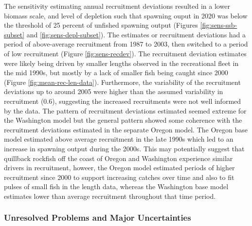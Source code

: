 \documentclass[11pt,
  english,
  a4paper,
]{article}
\begin{document}
\leavevmode\tagmcend\tagstructend\par


The sensitivity estimating annual recruitment deviations resulted in a lower biomass scale, and level of depletion such that spawning ouput in 2020 was below the threshold of 25 percent of unfished spawning output (Figures \ref{fig:sens-ssb-subset} and \ref{fig:sens-depl-subset}). The estimates or recruitment deviations had a period of above-average recruitment from 1987 to 2003, then switched to a period of low recruitment (Figure \ref{fig:sens-recdev}). The recruitment deviation estimates were likely being driven by smaller lengths observed in the recreational fleet in the mid 1990s, but mostly by a lack of smaller fish being caught since 2000 (Figure \ref{fig:mean-rec-len-data}). Furthermore, the variability of the recruitment deviations up to around 2005 were higher than the assumed variability in recruitment (0.6), suggesting the increased recruitments were not well informed by the data. The pattern of recruitment deviations estimated seemed extreme for the Washington model but the general pattern showed some coherence with the recruitment deviations estimated in the separate Oregon model. The Oregon base model estimated above average recruitment in the late 1990s which led to an increase in spawning output during the 2000s. This may potentially suggest that quillback rockfish off the coast of Oregon and Washington experience similar drivers in recruitment, howeer, the Oregon model estimated periods of higher recruitment since 2000 to support increasing catches over time and also to fit pulses of small fish in the length data, whereas the Washington base model estimates lower than average recruitment throughout that time period.

\leavevmode\tagmcend\tagstructend\par


\hypertarget{unresolved-problems-and-major-uncertainties-1}{%
\subsubsection{Unresolved Problems and Major Uncertainties}\label{unresolved-problems-and-major-uncertainties-1}}

\leavevmode\tagmcend\tagstructend

\end{document}
